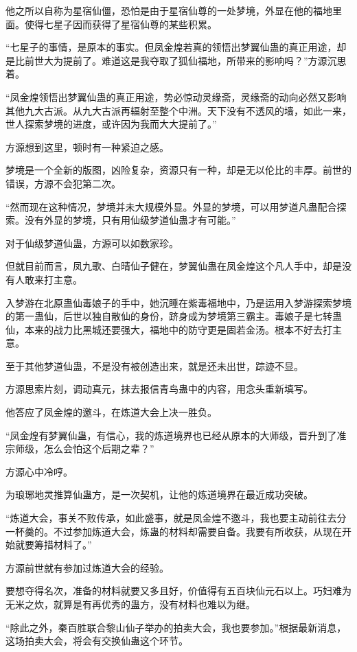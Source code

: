 \begin{this_body}
他之所以自称为星宿仙僵，恐怕是由于星宿仙尊的一处梦境，外显在他的福地里面。使得七星子因而获得了星宿仙尊的某些积累。

“七星子的事情，是原本的事实。但凤金煌若真的领悟出梦翼仙蛊的真正用途，却是比前世大为提前了。难道这是我夺取了狐仙福地，所带来的影响吗？”方源沉思着。

“凤金煌领悟出梦翼仙蛊的真正用途，势必惊动灵缘斋，灵缘斋的动向必然又影响其他九大古派。从九大古派再辐射至整个中洲。天下没有不透风的墙，如此一来，世人探索梦境的进度，或许因为我而大大提前了。”

方源想到这里，顿时有一种紧迫之感。

梦境是一个全新的版图，凶险复杂，资源只有一种，却是无以伦比的丰厚。前世的错误，方源不会犯第二次。

“然而现在这种情况，梦境并未大规模外显。外显的梦境，可以用梦道凡蛊配合探索。没有外显的梦境，只有用仙级梦道仙蛊才有可能。”

对于仙级梦道仙蛊，方源可以如数家珍。

但就目前而言，凤九歌、白晴仙子健在，梦翼仙蛊在凤金煌这个凡人手中，却是没有人敢来打主意。

入梦游在北原蛊仙毒娘子的手中，她沉睡在紫毒福地中，乃是运用入梦游探索梦境的第一蛊仙，后世以独自散仙的身份，跻身成为梦境第三霸主。毒娘子是七转蛊仙，本来的战力比黑城还要强大，福地中的防守更是固若金汤。根本不好去打主意。

至于其他梦道仙蛊，不是没有被创造出来，就是还未出世，踪迹不显。

方源思索片刻，调动真元，抹去报信青鸟蛊中的内容，用念头重新填写。

他答应了凤金煌的邀斗，在炼道大会上决一胜负。

“凤金煌有梦翼仙蛊，有信心，我的炼道境界也已经从原本的大师级，晋升到了准宗师级，怎么会怕这个后期之辈？”

方源心中冷哼。

为琅琊地灵推算仙蛊方，是一次契机，让他的炼道境界在最近成功突破。

“炼道大会，事关不败传承，如此盛事，就是凤金煌不邀斗，我也要主动前往去分一杯羹的。不过参加炼道大会，炼蛊的材料却需要自备。我要有所收获，从现在开始就要筹措材料了。”

方源前世就有参加过炼道大会的经验。

要想夺得名次，准备的材料就要又多且好，价值得有五百块仙元石以上。巧妇难为无米之炊，就算是有再优秀的蛊方，没有材料也难以为继。

“除此之外，秦百胜联合黎山仙子举办的拍卖大会，我也要参加。”根据最新消息，这场拍卖大会，将会有交换仙蛊这个环节。


\end{this_body}
